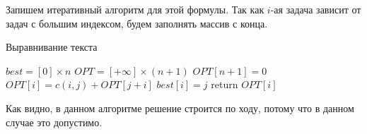 Запишем итеративный алгоритм для этой формулы.
Так как $i$-ая задача зависит от задач с большим индексом, будем заполнять массив с конца.

\begin{algorithm}
	\caption{Выравнивание текста}
	\begin{algorithmic}
			\State \(best = [0] \times n\)
			\State \(OPT = [+\infty] \times (n + 1)\)
			\State $OPT[n + 1] = 0$
						\State \(OPT[i] = c(i, j) + OPT[j + i]\)
						\State \(best[i] = j\)
					\EndIf
				\EndFor
			\EndFor
			\State return $OPT[i]$
		\EndFunction
	\end{algorithmic}
\end{algorithm}

Как видно, в данном алгоритме решение строится по ходу, потому что в данном случае это допустимо.


